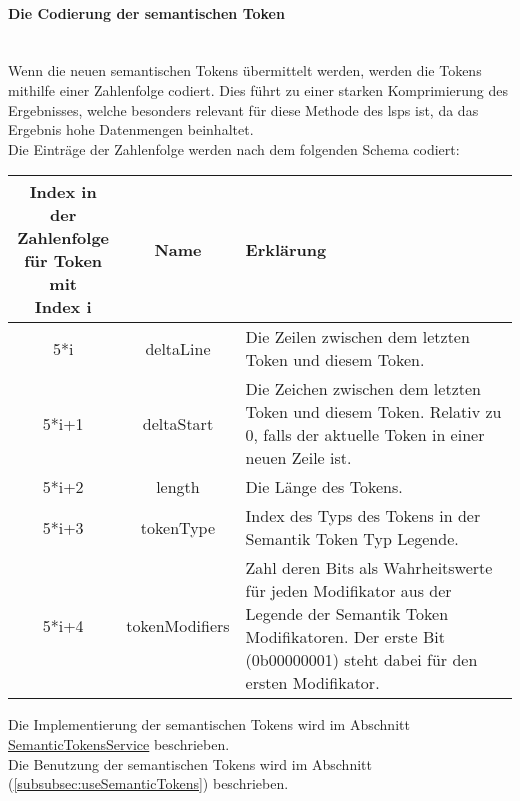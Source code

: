 \documentclass[./einleitung.tex]{subfiles}
\begin{document}
    \paragraph{Die Codierung der semantischen Token}\label{par:semantic-code}\mbox{}\\
    Wenn die neuen semantischen Tokens übermittelt werden, werden die Tokens mithilfe einer Zahlenfolge codiert.
    Dies führt zu einer starken Komprimierung des Ergebnisses, welche besonders relevant für diese Methode des \acrshort{lsp}s ist, da das Ergebnis hohe Datenmengen beinhaltet.\\
    Die Einträge der Zahlenfolge werden nach dem folgenden Schema codiert:
    \begin{center}
        \begin{tabular}{| c | c | m{21.5em} |}
            \hline
            \makecell{Index in der\\ Zahlenfolge\\für Token mit \\Index i} & Name & Erklärung \\
            \hline
            5*i & deltaLine & Die Zeilen zwischen dem letzten Token und diesem Token. \\
            \hline
            5*i+1 & deltaStart & Die Zeichen zwischen dem letzten Token und diesem Token.
            Relativ zu 0, falls der aktuelle Token in einer neuen Zeile ist. \\
            \hline
            5*i+2 & length & Die Länge des Tokens. \\
            \hline
            5*i+3 & tokenType & Index des Typs des Tokens in der Semantik Token Typ Legende. \\
            \hline
            5*i+4 & tokenModifiers & Zahl deren Bits als Wahrheitswerte für jeden Modifikator aus der Legende der Semantik Token Modifikatoren.
            Der erste Bit (0b00000001) steht dabei für den ersten Modifikator. \\
            \hline
        \end{tabular}
    \end{center}
    Die Implementierung der semantischen Tokens wird im Abschnitt \hyperref[subsubsec:semantic-service]{SemanticTokensService} beschrieben.\\
    Die Benutzung der semantischen Tokens wird im Abschnitt  (\ref{subsubsec:useSemanticTokens}) beschrieben.
\end{document}
